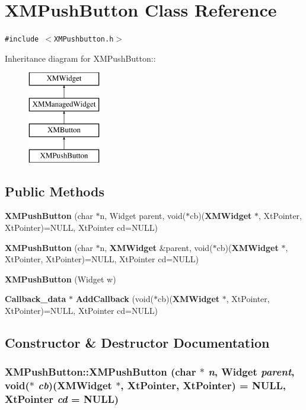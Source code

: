 \section{XMPush\-Button  Class Reference}
\label{classXMPushButton}
{\tt \#include $<$XMPushbutton.h$>$}

Inheritance diagram for XMPush\-Button::\begin{figure}[H]
\begin{center}
\leavevmode
\includegraphics[height=4cm]{classXMPushButton}
\end{center}
\end{figure}
\subsection*{Public Methods}
\begin{CompactItemize}
\item 
{\bf XMPush\-Button} (char $\ast$n, Widget parent, void($\ast$cb)({\bf XMWidget} $\ast$, Xt\-Pointer, Xt\-Pointer)=NULL, Xt\-Pointer cd=NULL)
\item 
{\bf XMPush\-Button} (char $\ast$n, {\bf XMWidget} \&parent, void($\ast$cb)({\bf XMWidget} $\ast$, Xt\-Pointer, Xt\-Pointer)=NULL, Xt\-Pointer cd=NULL)
\item 
{\bf XMPush\-Button} (Widget w)
\item 
{\bf Callback\_\-data} $\ast$ {\bf Add\-Callback} (void($\ast$cb)({\bf XMWidget} $\ast$, Xt\-Pointer, Xt\-Pointer)=NULL, Xt\-Pointer cd=NULL)
\end{CompactItemize}


\subsection{Constructor \& Destructor Documentation}
\subsubsection{\setlength{\rightskip}{0pt plus 5cm}XMPush\-Button::XMPush\-Button (char $\ast$ {\em n}, Widget {\em parent}, void($\ast$ {\em cb})({\bf XMWidget} $\ast$, Xt\-Pointer, Xt\-Pointer) = NULL, Xt\-Pointer {\em cd} = NULL)\hspace{0.3cm}{\tt  [inline]}}\label{classXMPushButton_a0}




